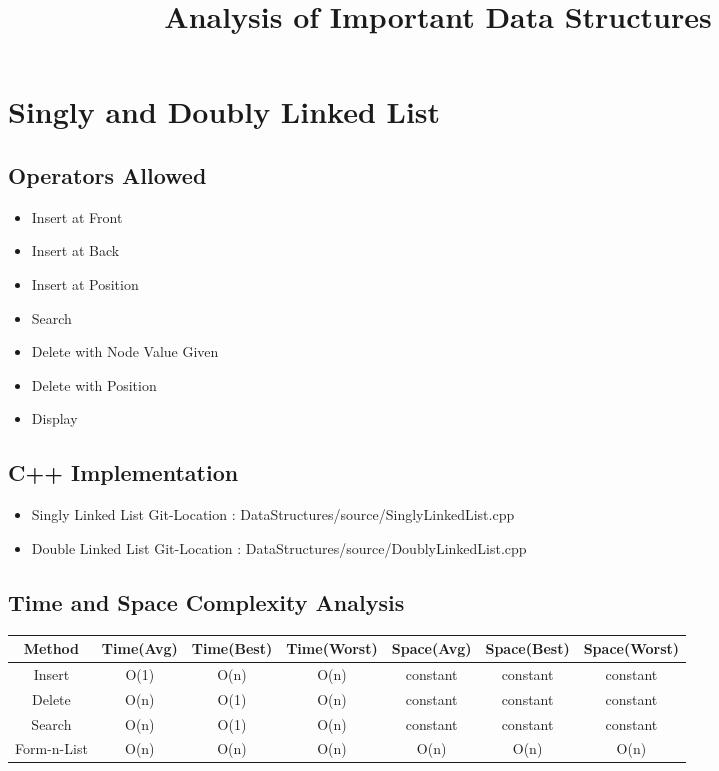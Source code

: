 \documentclass{article}
\begin{document}
{
\centering \title*{\huge \textbf Analysis of Important Data Structures} 
}
\section{Singly and Doubly Linked List}
\subsection{Operators Allowed}
\begin{itemize}
\renewcommand{\labelitemi}{$\bullet$}
    \item Insert at Front
    \item Insert at Back
    \item Insert at Position
    \item Search
    \item Delete with Node Value Given
    \item Delete with Position
    \item Display
\end{itemize}
\subsection{C++ Implementation}
\begin{itemize}
\renewcommand{\labelitemi}{$\bullet$}
    \item Singly Linked List Git-Location : DataStructures/source/SinglyLinkedList.cpp
    \item Double Linked List Git-Location : DataStructures/source/DoublyLinkedList.cpp
\end{itemize}
\subsection{Time and Space Complexity Analysis}
\begin{tabular}{c c c c c c c}
\hline\hline 
Method & Time(Avg) & Time(Best) & Time(Worst) & Space(Avg) & Space(Best) & Space(Worst) \\
\hline
Insert & O(1) & O(n) & O(n) & constant & constant & constant\\
Delete & O(n) & O(1) & O(n) & constant & constant & constant \\
Search & O(n) & O(1) & O(n) & constant & constant & constant \\
Form-n-List & O(n) & O(n) & O(n) & O(n) & O(n) & O(n) \\
\hline %
\end{tabular}
\end{document}

